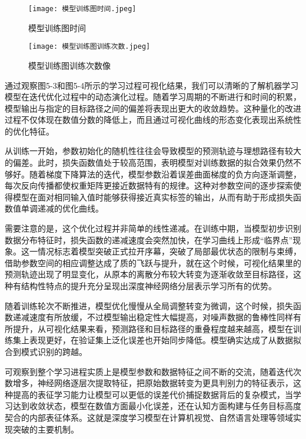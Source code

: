 \begin{figure}[hbt]
	\centering
	\texttt{[image: 模型训练图时间.jpeg]}
	\caption{模型训练图时间}
	\label{f.example}
\end{figure}


\begin{figure}[hbt]
	\centering
	\texttt{[image: 模型训练图训练次数.jpeg]}
	\caption{模型训练图训练次数像}
	\label{f.example}
\end{figure}

通过观察图5-3和图5-4所示的学习过程可视化结果，我们可以清晰的了解机器学习模型在迭代优化过程中的动态演化过程。随着学习周期的不断进行和时间的积累，模型输出与指定的目标路径之间的偏差将表现出更大的收敛趋势。这种量化的改进过程不仅体现在数值分数的降低上，而且通过可视化曲线的形态变化表现出系统性的优化特征。

从训练一开始，参数初始化的随机性往往会导致模型的预测轨迹与理想路径有较大的偏差。此时，损失函数值处于较高范围，表明模型对训练数据的拟合效果仍然不够好。随着梯度下降算法的迭代，模型参数沿着误差曲面梯度的负方向逐渐调整，每次反向传播都使权重矩阵更接近数据特有的规律。这种对参数空间的逐步探索使得模型在面对相同输入值时能够获得接近真实标签的输出，从而有助于形成损失函数值单调递减的优化曲线。


需要注意的是，这个优化过程并非简单的线性递减。在训练中期，当模型初步识别数据分布特征时，损失函数的递减速度会突然加快，在学习曲线上形成“临界点”现象。这一情况标志着模型突破正式拉开序幕，突破了局部最优状态的限制与束缚，借助参数空间的相应调整达成了质的飞跃与提升，就在这个时候，可视化结果里的预测轨迹出现了明显变化，从原本的离散分布较大转变为逐渐收敛至目标路径，这种有结构性特点的提升充分呈现出深度神经网络分层表示学习所有的优势。

随着训练轮次不断推进，模型优化慢慢从全局调整转变为微调，这个时候，损失函数递减速度有所放缓，不过模型输出稳定性大幅提高，对噪声数据的鲁棒性同样有所提升，从可视化结果来看，预测路径和目标路径的重叠程度越来越高，模型在训练集上表现更好，在验证集上泛化误差也开始同步降低。模型确实达成了从数据拟合到模式识别的跨越。

可观察到整个学习进程实质上是模型参数和数据特征之间不断的交流，随着迭代次数增多，神经网络逐层次提取特征，把原始数据转变为更具判别力的特征表示，这种提高的表征学习能力让模型可以更低的误差代价捕捉数据背后的复杂模式，当学习达到收敛状态，模型在数值方面最小化误差，还在认知方面构建与任务目标高度契合的内部表征体系。这就是深度学习模型在计算机视觉、自然语言处理等领域实现突破的主要机制。








